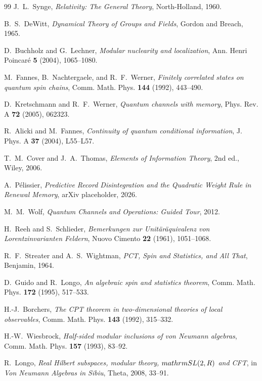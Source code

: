 \documentclass[11pt]{article}
\theoremstyle{definition}
\theoremstyle{remark}
\newcommand{\R}{\mathbb R}
\begin{document}
\begin{thebibliography}{99}
J.~L.~Synge, \emph{Relativity: The General Theory}, North-Holland, 1960.

B.~S.~DeWitt, \emph{Dynamical Theory of Groups and Fields},
Gordon and Breach, 1965.

D.~Buchholz and G.~Lechner,
\emph{Modular nuclearity and localization},
Ann. Henri Poincar\'e \textbf{5} (2004), 1065--1080.

M.~Fannes, B.~Nachtergaele, and R.~F.~Werner,
\emph{Finitely correlated states on quantum spin chains},
Comm. Math. Phys. \textbf{144} (1992), 443--490.

D.~Kretschmann and R.~F.~Werner, \emph{Quantum channels with memory},
Phys. Rev. A \textbf{72} (2005), 062323.

R.~Alicki and M.~Fannes,
\emph{Continuity of quantum conditional information},
J. Phys. A \textbf{37} (2004), L55--L57.

T.~M.~Cover and J.~A.~Thomas, \emph{Elements of Information Theory}, 2nd ed.,
Wiley, 2006.

A.~P\'elissier,
\emph{Predictive Record Disintegration and the Quadratic Weight Rule in Renewal Memory},
arXiv placeholder, 2026.

M.~M.~Wolf, \emph{Quantum Channels and Operations: Guided Tour}, 2012.

H.~Reeh and S.~Schlieder, \emph{Bemerkungen zur Unit\"ar\"aquivalenz von
Lorentzinvarianten Feldern}, Nuovo Cimento \textbf{22} (1961), 1051--1068.

R.~F.~Streater and A.~S.~Wightman, \emph{PCT, Spin and Statistics, and All That},
Benjamin, 1964.

D.~Guido and R.~Longo, \emph{An algebraic spin and statistics theorem},
Comm. Math. Phys. \textbf{172} (1995), 517--533.

H.-J.~Borchers,
\emph{The CPT theorem in two-dimensional theories of local observables},
Comm. Math. Phys. \textbf{143} (1992), 315--332.

H.-W.~Wiesbrock, \emph{Half-sided modular inclusions of von Neumann algebras},
Comm. Math. Phys. \textbf{157} (1993), 83--92.

R.~Longo, \emph{Real Hilbert subspaces, modular theory, $\\mathrm{SL}(2,\\R)$ and
CFT}, in \emph{Von Neumann Algebras in Sibiu}, Theta, 2008, 33--91.


\end{thebibliography}
\end{document}
